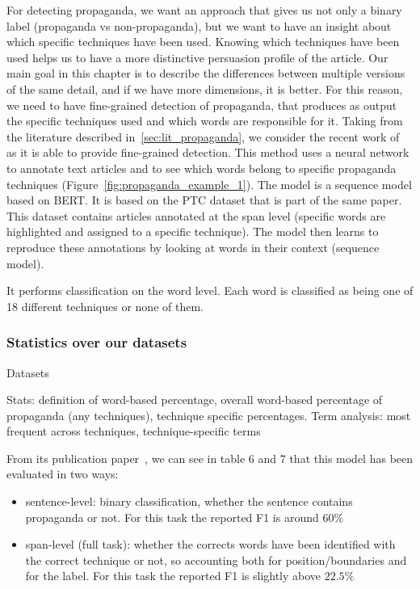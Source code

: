 For detecting propaganda, we want an approach that gives us not only a binary label (propaganda vs non-propaganda), but we want to have an insight about which specific techniques have been used.
Knowing which techniques have been used helps us to have a more distinctive persuasion profile of the article. Our main goal in this chapter is to describe the differences between multiple versions of the same detail, and if we have more dimensions, it is better.
For this reason, we need to have fine-grained detection of propaganda, that produces as output the specific techniques used and which words are responsible for it.
Taking from the literature described in~\ref{sec:lit_propaganda}, we consider the recent work of~\cite{da2019fine} as it is able to provide fine-grained detection. This method uses a neural network to annotate text articles and to see which words belong to specific propaganda techniques (Figure~\ref{fig:propaganda_example_1}).
The model is a sequence model based on BERT. It is based on the PTC dataset that is part of the same paper. This dataset contains articles annotated at the span level (specific words are highlighted and assigned to a specific technique). The model then learns to reproduce these annotations by looking at words in their context (sequence model).

It performs classification on the word level. Each word is classified as being one of 18 different techniques or none of them.


\subsubsection{\statusred Statistics over our datasets}
\label{ssec:lp_techniques_propaganda_stats}

Datasets

Stats: definition of word-based percentage, overall word-based percentage of propaganda (any techniques), technique specific percentages. Term analysis: most frequent across techniques, technique-specific terms


From its publication paper~\cite{da2019fine}, we can see in table 6 and 7 that this model has been evaluated in two ways:

\begin{itemize}
    \item sentence-level: binary classification, whether the sentence contains propaganda or not. For this task the reported F1 is around $60\%$
    \item span-level (full task): whether the corrects words have been identified with the correct technique or not, so accounting both for position/boundaries and for the label. For this task the reported F1 is slightly above $22.5\%$
\end{itemize}

